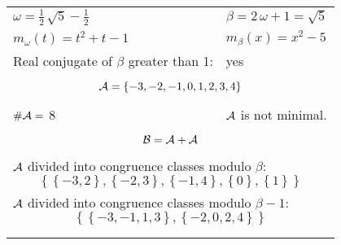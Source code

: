 \begin{exmp}
\label{ex:compareAK}


\rule{0cm}{0cm}

\begin{tabular}{ll}
$\omega=  \frac{1}{2} \, \sqrt{5} - \frac{1}{2} $  & $\beta= 2 \, \omega + 1 = \sqrt{5} $\\
$m_\omega(t)=  t^{2} + t - 1 $  & $m_\beta(x)=  x^{2} - 5 $\\
Real conjugate of $\beta$ greater than 1:   &  yes \\ \hline
\multicolumn{2}{l}{\begin{minipage}{\textwidth}\begin{dmath*}\A = \left\{-3, -2, -1, 0, 1, 2, 3, 4\right\}  \end{dmath*}\end{minipage} }\\
$\#\mathcal{A}= $ 8 $ $ & $\mathcal{A}$ is not minimal. \\
\multicolumn{2}{l}{\begin{minipage}{\textwidth}\begin{dmath*}\B =\A+\A \end{dmath*}\end{minipage} }\\[10pt]
\multicolumn{2}{l}{\begin{minipage}{\textwidth}$\mathcal{A}$ divided into congruence classes modulo $\beta$: \begin{dmath*} \left\{\left\{-3, 2\right\}, \left\{-2, 3\right\}, \left\{-1, 4\right\}, \left\{0\right\}, \left\{1\right\}\right\}  \end{dmath*}\end{minipage} }\\[10pt]
\multicolumn{2}{l}{\begin{minipage}{\textwidth}$\mathcal{A}$ divided into congruence classes modulo $\beta-1$: \begin{dmath*} \left\{\left\{-3, -1, 1, 3\right\}, \left\{-2, 0, 2, 4\right\}\right\}  \end{dmath*}\end{minipage} }\\
 & \\ \hline
 & \\
\end{tabular}


\end{exmp}
